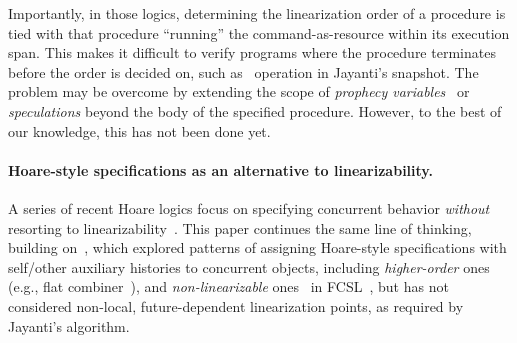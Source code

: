 Importantly, in those logics, determining the linearization order of a
procedure is tied with that procedure ``running'' the
command-as-resource within its execution span. This makes it difficult
to verify programs where the procedure terminates before the order is
decided on, such as \jywrite~operation in Jayanti's snapshot. The
problem may be overcome by extending the scope of \emph{prophecy
  variables}~\cite{AbadiL+lics88} or \emph{speculations} beyond the
body of the specified procedure. However, to the best of our
knowledge, this has not been done yet.


%

\paragraph{Hoare-style specifications as an alternative to
  linearizability.} 

A series of recent Hoare logics focus on specifying concurrent
behavior \emph{without} resorting to
linearizability~\cite{SergeyNB+ESOP15, SergeyNBD+OOPSLA16, SvendsenB+ESOP14,
  PintoDYG+ECOOP14, JungSSSTBD+POPL15}.
%
This paper continues the same line of thinking, building
on~\cite{SergeyNB+ESOP15}, which explored patterns of assigning
Hoare-style specifications with self/other auxiliary histories to
concurrent objects, including \emph{higher-order} ones (e.g., {flat
  combiner}~\cite{HendlerHIST+SPAA10}), and \emph{non-linearizable}
ones~\cite{SergeyNBD+OOPSLA16} in FCSL~\cite{NanevskiLSD+ESOP14}, but
has not considered non-local, future-dependent linearization points,
as required by Jayanti's algorithm.
%

